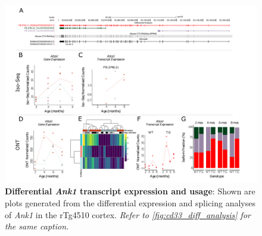 \begin{landscape}
	\begin{figure}[htp]
		\begin{center}
			\includegraphics[page=3,trim={0 0.5cm 0 1.5cm},scale =0.85]{Figures/TargetGene_DifferentialAnalysis.pdf}
		\end{center}
		\captionsetup{width=1.5\textwidth}
		\caption[Differential \textit{Ank1} transcript expression and usage]%
		{\textbf{Differential \textit{Ank1} transcript expression and usage}: Shown are plots generated from the differential expression and splicing analyses of \textit{Ank1} in the rTg4510 cortex. \textit{Refer to \cref{fig:cd33_diff_analysis} for the same caption.}}   
		\label{fig:Ank1_diff_analysis}
	\end{figure}
\end{landscape}

